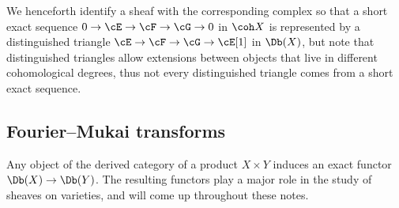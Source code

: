 \documentclass{amsart}
\begin{document}
We henceforth identify a sheaf with the corresponding complex so that a short exact sequence $0 \to \cE \to \cF \to \cG \to 0$ in $\coh X$ is represented by a distinguished triangle $\cE \to \cF \to \cG \to \cE[1]$ in $\Db(X)$, but note that distinguished triangles allow extensions between objects that live in different cohomological degrees, thus not every distinguished triangle comes from a short exact sequence.
\def\cI{{\mathcal I}}



\subsection{Fourier--Mukai transforms}
Any object of the derived category of a product $X\times Y$ induces an exact functor $\Db(X)\to \Db(Y)$.  The resulting functors play a major role in the study of sheaves on varieties, and will come up throughout these notes.
\end{document}
